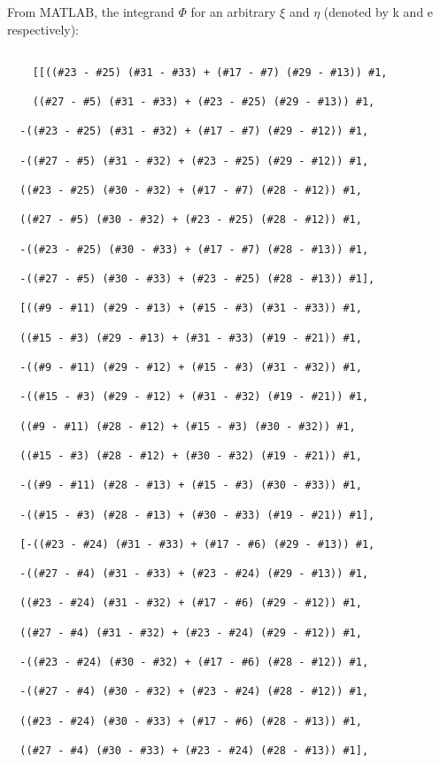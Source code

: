\documentclass[../main.tex]{subfiles}
\begin{document}
From MATLAB, the integrand \(\Phi\) for an arbitrary \(\xi\) and \(\eta\) (denoted by k and e respectively):

\begin{verbatim}

    [[((#23 - #25) (#31 - #33) + (#17 - #7) (#29 - #13)) #1, 
    
    ((#27 - #5) (#31 - #33) + (#23 - #25) (#29 - #13)) #1,

  -((#23 - #25) (#31 - #32) + (#17 - #7) (#29 - #12)) #1, 
  
  -((#27 - #5) (#31 - #32) + (#23 - #25) (#29 - #12)) #1,

  ((#23 - #25) (#30 - #32) + (#17 - #7) (#28 - #12)) #1, 
  
  ((#27 - #5) (#30 - #32) + (#23 - #25) (#28 - #12)) #1,

  -((#23 - #25) (#30 - #33) + (#17 - #7) (#28 - #13)) #1, 
  
  -((#27 - #5) (#30 - #33) + (#23 - #25) (#28 - #13)) #1],

  [((#9 - #11) (#29 - #13) + (#15 - #3) (#31 - #33)) #1, 
  
  ((#15 - #3) (#29 - #13) + (#31 - #33) (#19 - #21)) #1,

  -((#9 - #11) (#29 - #12) + (#15 - #3) (#31 - #32)) #1, 
  
  -((#15 - #3) (#29 - #12) + (#31 - #32) (#19 - #21)) #1,

  ((#9 - #11) (#28 - #12) + (#15 - #3) (#30 - #32)) #1, 
  
  ((#15 - #3) (#28 - #12) + (#30 - #32) (#19 - #21)) #1,

  -((#9 - #11) (#28 - #13) + (#15 - #3) (#30 - #33)) #1, 
  
  -((#15 - #3) (#28 - #13) + (#30 - #33) (#19 - #21)) #1],

  [-((#23 - #24) (#31 - #33) + (#17 - #6) (#29 - #13)) #1, 
  
  -((#27 - #4) (#31 - #33) + (#23 - #24) (#29 - #13)) #1,

  ((#23 - #24) (#31 - #32) + (#17 - #6) (#29 - #12)) #1, 
  
  ((#27 - #4) (#31 - #32) + (#23 - #24) (#29 - #12)) #1,

  -((#23 - #24) (#30 - #32) + (#17 - #6) (#28 - #12)) #1, 
  
  -((#27 - #4) (#30 - #32) + (#23 - #24) (#28 - #12)) #1,

  ((#23 - #24) (#30 - #33) + (#17 - #6) (#28 - #13)) #1, 
  
  ((#27 - #4) (#30 - #33) + (#23 - #24) (#28 - #13)) #1],


\end{verbatim}
\end{document}

